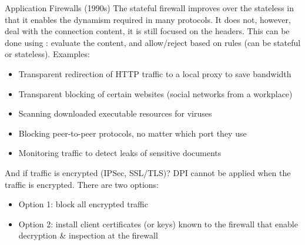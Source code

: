 \begin{parag}{Application Firewalls (1990s)}
    The stateful firewall improves over the stateless in that it enables the dynamism required in many protocols. It does not, however, deal with the connection content, it is still focused on the headers. This can be done using : evaluate the content, and allow/reject based on rules (can be stateful or stateless). Examples:
	\begin{itemize}
	    \item Transparent redirection of HTTP traffic to a local proxy to save bandwidth
	    \item Transparent blocking of certain websites (social networks from a workplace)
	    \item Scanning downloaded executable resources for viruses
	    \item Blocking peer-to-peer protocols, no matter which port they use
	    \item Monitoring traffic to detect leaks of sensitive documents
	\end{itemize}
	\begin{subparag}{And if traffic is encrypted (IPSec, SSL/TLS)?}
	    DPI cannot be applied when the traffic is encrypted. There are two options:
		\begin{itemize}
		    \item Option 1: block all encrypted traffic
		    \item Option 2: install client certificates (or keys) known to the firewall that enable decryption \& inspection at the firewall
		\end{itemize}
	\end{subparag}
\end{parag}

